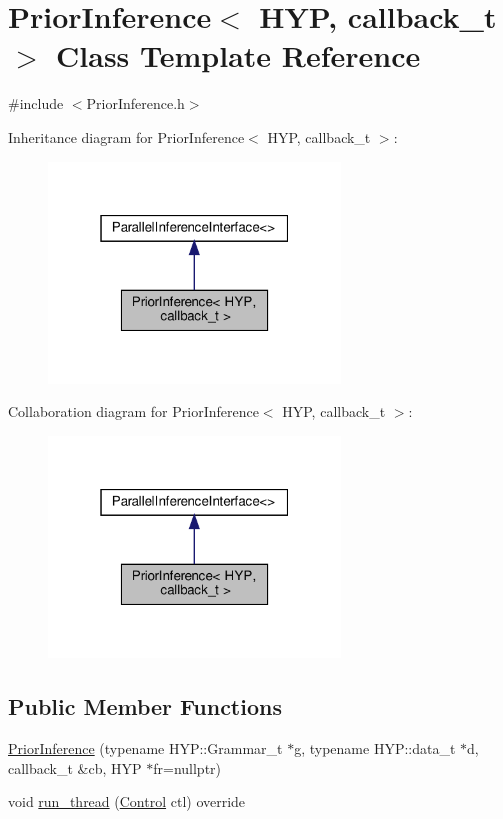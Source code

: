 \hypertarget{class_prior_inference}{}\section{Prior\+Inference$<$ H\+YP, callback\+\_\+t $>$ Class Template Reference}
\label{class_prior_inference}


{\ttfamily \#include $<$Prior\+Inference.\+h$>$}



Inheritance diagram for Prior\+Inference$<$ H\+YP, callback\+\_\+t $>$\+:
\nopagebreak
\begin{figure}[H]
\begin{center}
\leavevmode
\includegraphics[width=220pt]{class_prior_inference__inherit__graph}
\end{center}
\end{figure}


Collaboration diagram for Prior\+Inference$<$ H\+YP, callback\+\_\+t $>$\+:
\nopagebreak
\begin{figure}[H]
\begin{center}
\leavevmode
\includegraphics[width=220pt]{class_prior_inference__coll__graph}
\end{center}
\end{figure}
\subsection*{Public Member Functions}
\begin{DoxyCompactItemize}
\item 
\hyperlink{class_prior_inference_af4726e923dcecf83533ba806b27f37ea}{Prior\+Inference} (typename H\+Y\+P\+::\+Grammar\+\_\+t $\ast$g, typename H\+Y\+P\+::data\+\_\+t $\ast$d, callback\+\_\+t \&cb, H\+YP $\ast$fr=nullptr)
\item 
void \hyperlink{class_prior_inference_a1c641618dffc7d3182ffdb2451500c01}{run\+\_\+thread} (\hyperlink{struct_control}{Control} ctl) override
\end{DoxyCompactItemize}

